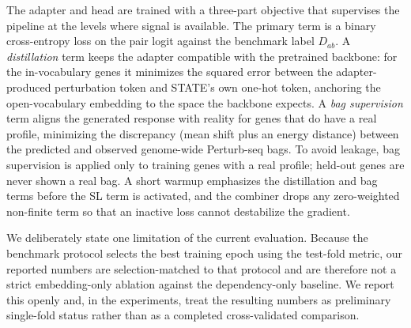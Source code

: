 The adapter and head are trained with a three-part objective that supervises the
pipeline at the levels where signal is available. The primary term is a binary
cross-entropy loss on the pair logit against the benchmark label $D_{ab}$. A
\emph{distillation} term keeps the adapter compatible with the pretrained
backbone: for the in-vocabulary genes it minimizes the squared error between the
adapter-produced perturbation token and STATE's own one-hot token, anchoring the
open-vocabulary embedding to the space the backbone expects. A \emph{bag
supervision} term aligns the generated response with reality for genes that do
have a real profile, minimizing the discrepancy (mean shift plus an energy
distance) between the predicted and observed genome-wide Perturb-seq bags. To
avoid leakage, bag supervision is applied only to training genes with a real
profile; held-out genes are never shown a real bag. A short warmup emphasizes the
distillation and bag terms before the SL term is activated, and the combiner
drops any zero-weighted non-finite term so that an inactive loss cannot
destabilize the gradient.

We deliberately state one limitation of the current evaluation. Because the
benchmark protocol selects the best training epoch using the test-fold metric,
our reported numbers are selection-matched to that protocol and are therefore not
a strict embedding-only ablation against the dependency-only baseline. We report
this openly and, in the experiments, treat the resulting numbers as preliminary
single-fold status rather than as a completed cross-validated comparison.
